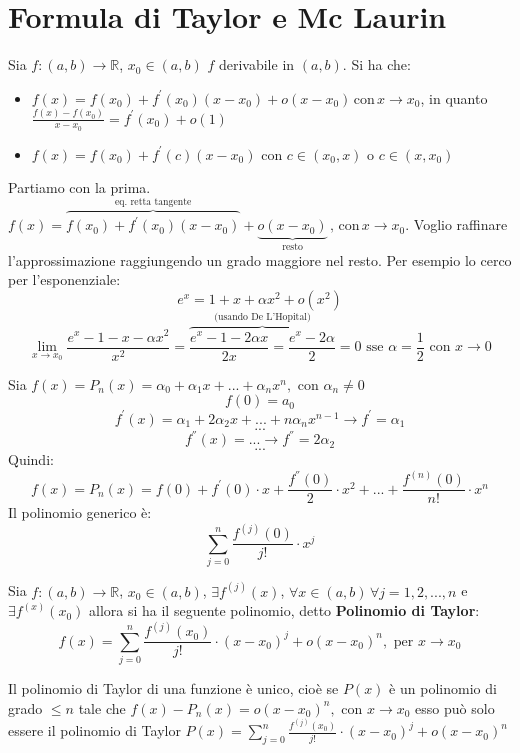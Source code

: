 \documentclass[a4paper,12pt, oneside]{book}
\begin{document}
\section{Formula di Taylor e Mc Laurin}
Sia $f:(a,b)\rightarrow\mathbb{R}$, $x_0\in (a,b)$ $f$ derivabile in $(a,b)$.
Si ha che:
\begin{itemize}
	\item $f(x)=f(x_0)+f^{'}(x_0)(x-x_0)+o(x-x_0)\, \mbox{con} \, x\rightarrow x_0$, in quanto \\$\frac{f(x)-f(x_0)}{x-x_0}=f^{'}(x_0)+o(1)$
	\item $f(x)=f(x_0)+f^{'}(c)(x-x_0)\mbox{ con } c\in(x_0,x) \mbox{ o } c\in (x,x_0)$
\end{itemize}
Partiamo con la prima.
$f(x)=\overbrace{f(x_0)+f^{'}(x_0)(x-x_0)}^{\mbox{eq. retta tangente}}+\underbrace{o(x-x_0)}_{\mbox{resto}}\, \mbox{, con} \, x\rightarrow x_0$. Voglio raffinare l'approssimazione raggiungendo un grado maggiore nel resto.
Per esempio lo cerco per l'esponenziale:
$$e^x=1+x+\alpha x^2+o(x^2)$$ $$\lim_{x\rightarrow x_0} \frac{e^x-1-x-\alpha x^2}{x^2}=\overbrace{\frac{e^x-1-2 \alpha x}{2x}=\frac{e^x-2 \alpha}{2}}^{\mbox{ (usando De L'Hopital) }}=0 \mbox{ sse }\alpha=\frac{1}{2}\mbox{ con } x\rightarrow 0$$
\newpage
\begin{osservazione}
	Sia $f(x)=P_n(x)=\alpha_0+\alpha_1 x+...+\alpha_n x^n, \mbox{ con } \alpha_n\neq 0$
	$$f(0)=a_0$$
	$$f^{'}(x)=\alpha_1+2 \alpha_2 x+...+n \alpha_n x^{n-1}\rightarrow f^{'}=\alpha_1$$
	$$...$$
	$$ f^{''}(x)=...\rightarrow f^{''}=2\alpha_2$$
	$$...$$
	Quindi:
	$$f(x)=P_n(x)=f(0)+f^{'}(0)\cdot x+\frac{f^{''}(0)}{2}\cdot x^2+...+\frac{f^{(n)}(0)}{n!}\cdot x^n$$
	Il polinomio generico è:
	$$\sum_{j=0}^{n} \frac{f^{(j)}(0)}{j!}\cdot x^j$$

\end{osservazione}
\begin{teorema}
	Sia $f:(a,b)\rightarrow\mathbb{R}$, $x_0\in (a,b)$, $\exists f^{(j)}(x)$, $\forall x\in (a,b)\, \forall j=1,2,...,n$ e $\exists f^{(x)}(x_0)$ allora si ha il seguente polinomio, detto \textbf{Polinomio di Taylor}:
	$$f(x)=\sum_{j=0}^{n} \frac{f^{(j)}(x_0)}{j!}\cdot {(x-x_0)}^j+o(x-x_0)^n, \mbox{ per } x\rightarrow x_0$$
\end{teorema}
\begin{osservazione}
	Il polinomio di Taylor di una funzione è unico, cioè se $P(x)$ è un polinomio di grado $\leq n$ tale che $f(x)-P_n(x)=o(x-x_0)^n, \mbox{ con } x\rightarrow x_0$ esso può solo essere il polinomio di Taylor $P(x)=\sum_{j=0}^{n} \frac{f^{(j)}(x_0)}{j!}\cdot {(x-x_0)}^j+o(x-x_0)^n$
\end{osservazione}
\end{document}
